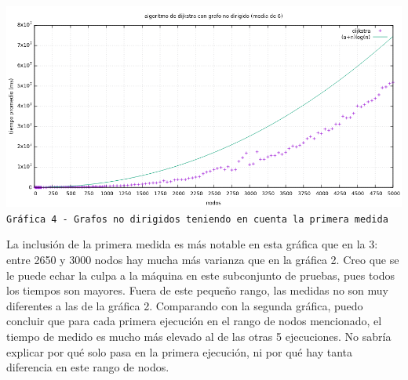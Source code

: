 \documentclass[12pt , a4paper]{article}
\begin{document}
	
	\newpage
	\hspace*{-.15\linewidth}
	\includegraphics[width=1.25\hsize]{nodir6.png}
	\texttt{Gráfica 4 - Grafos no dirigidos teniendo en cuenta la primera medida}
	\newline
	
	La inclusión de la primera medida es más notable en esta gráfica que en la 3: entre 2650 y 3000 nodos hay mucha más varianza que en la gráfica 2. Creo que se le puede echar la culpa a la máquina en este subconjunto de pruebas, pues todos los tiempos son mayores. Fuera de este pequeño rango, las medidas no son muy diferentes a las de la gráfica 2.
	Comparando con la segunda gráfica, puedo concluir que para cada primera ejecución en el rango de nodos mencionado, el tiempo de medido es mucho más elevado al de las otras 5 ejecuciones. No sabría explicar por qué solo pasa en la primera ejecución, ni por qué hay tanta diferencia en este rango de nodos.
\end{document}
